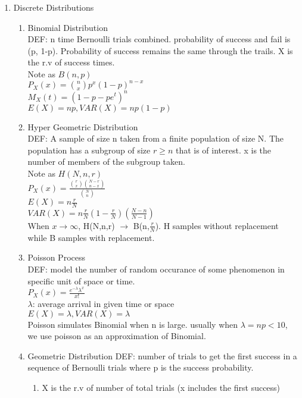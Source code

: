 \documentclass[10pt]{article}
\begin{document}
\begin{multicols}{2}
\begin{enumerate}
			\item Discrete Distributions
			\begin{enumerate}
				\item Binomial Distribution\\
				DEF: n time Bernoulli trials combined. probability of success and fail is (p, 1-p). Probability of success remains the same through the trails. X is the r.v of success times.\\
				Note as $B(n,p)$\\
				$P_X(x) = {n \choose x} p^x (1-p)^{n-x}$\\
				$M_X(t) = (1-p-pe^t)^n$\\
				$E(X) = np, VAR(X) = np(1-p)$
				\item Hyper Geometric Distribution\\
				DEF: A sample of size n taken from a finite population of size N. The population has a subgroup of size $r \ge n$ that is of interest. x is the number of members of the subgroup taken.\\
				Note as $H(N,n,r)$\\
				$P_X(x) = \frac{{r \choose x}{N-r \choose n-x}}{{N \choose n}}$\\
				$E(X) = n\frac{r}{N}$\\
				$VAR(X) = n\frac{r}{N}(1-\frac{r}{N})(\frac{N-n}{N-1})$\\
				When $x \rightarrow \infty$, H(N,n,r) $\rightarrow$ B(n,$\frac{r}{N}$). H samples without replacement while B samples with replacement.
				\item Poisson Process\\
				DEF: model the number of random occurance of some phenomenon in specific unit of space or time.\\
				$P_X(x) = \frac{e^{-\lambda}\lambda^x}{x!}$\\
				$\lambda$: average arrival in given time or space\\
				$E(X) = \lambda, VAR(X) = \lambda$\\
				Poisson simulates Binomial when n is large. usually when $\lambda = np < 10$, we use poisson as an approximation of Binomial.
				\item Geometric Distribution
				DEF: number of trials to get the first success in a sequence of Bernoulli trials where p is the success probability.
				\begin{enumerate}
					\item X is the r.v of number of total trials (x includes the first success)\\

\end{enumerate}
\end{enumerate}
\end{enumerate}
\end{multicols}
\end{document}
